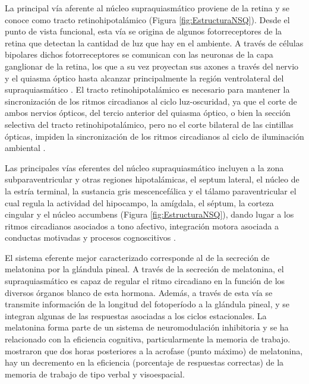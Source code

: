 \documentclass[12pt,letterpaper,final]{article}
\let\cite\cite %
\begin{document}
La principal vía aferente al núcleo supraquiasmático proviene de la retina y se conoce como tracto retinohipotalámico (Figura \ref{fig:EstructuraNSQ}). Desde el punto de vista funcional, esta vía se origina de algunos fotorreceptores de la retina que detectan la cantidad de luz que hay en el ambiente. A través de células bipolares dichos fotorreceptores se comunican con las neuronas de la capa ganglionar de la retina, los que a su vez proyectan sus axones a través del nervio y el quiasma óptico hasta alcanzar principalmente la región ventrolateral del supraquiasmático \cite{Moore1972}. El tracto retinohipotalámico es necesario para mantener la sincronización de los ritmos circadianos al ciclo luz-oscuridad, ya que el corte de ambos nervios ópticos, del tercio anterior del quiasma óptico, o bien la sección selectiva del tracto retinohipotalámico, pero no el corte bilateral de las cintillas ópticas, impiden la sincronización de los ritmos circadianos al ciclo de iluminación ambiental \cite{Johnson1988,Moore1974}.

Las principales vías eferentes del núcleo supraquiasmático incluyen a la zona subparaventricular y otras regiones hipotalámicas, el septum lateral, el núcleo de la estría terminal,  la sustancia gris mescencefálica y el tálamo paraventricular el cual regula la actividad del hipocampo, la amígdala, el séptum, la corteza cingular y el núcleo accumbens (Figura \ref{fig:EstructuraNSQ}), dando lugar a los ritmos circadianos asociados a tono afectivo, integración motora asociada a conductas motivadas y procesos cognoscitivos  \cite{Berk1981}.

El sistema eferente mejor caracterizado corresponde al de la secreción de melatonina por la glándula pineal. A través de la secreción de melatonina, el supraquiasmático es capaz de regular el ritmo circadiano en la función de los diversos órganos blanco de esta hormona. Además, a través de esta vía se transmite información de la longitud del fotoperíodo a la glándula pineal, y se integran algunas de las respuestas asociadas a los ciclos estacionales. La melatonina forma parte de un sistema de neuromodulación inhibitoria y se ha relacionado con la eficiencia cognitiva, particularmente la memoria de trabajo.   mostraron que dos horas posteriores a la acrofase (punto máximo) de melatonina, hay un decremento en la eficiencia (porcentaje de respuestas correctas) de la memoria de trabajo de tipo verbal y visoespacial.
\end{document}
